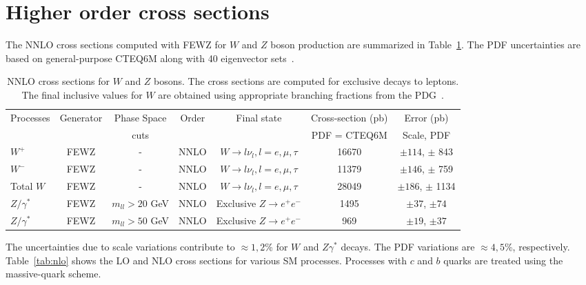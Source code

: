 \section{Higher order cross sections}
\label{sec:results}
The NNLO cross sections computed with FEWZ for $W$ and $Z$ boson production 
are summarized in 
Table~\ref{tab:nnlo}. The PDF uncertainties are based on general-purpose 
CTEQ6M along with 40 eigenvector sets~\cite{cteq6m}.

\vspace{3mm}
\begin{table}[hbt]
\begin{center}
\renewcommand{\arraystretch}{1.2}
\begin{tabular}{|l|c|c|c|c|c|c|}\hline
Processes & Generator & Phase Space& Order & Final state & Cross-section (pb)& Error (pb) \\ 
 &  &  cuts & & & PDF = CTEQ6M & Scale, PDF \\ \hline
$W^+$ & FEWZ & - & NNLO & $W \rightarrow l \nu_l, l=e,\mu,\tau$ & 16670 & $\pm 114$, $\pm$ 843 \\ \hline
$W^-$ & FEWZ & - & NNLO & $W \rightarrow l \nu_l, l=e,\mu,\tau$ & 11379 & $\pm 146$, $\pm$ 759 \\ \hline
Total $W$ & FEWZ & - & NNLO & $W \rightarrow l \nu_l, l=e,\mu,\tau$ & 28049 & $\pm 186$, $\pm$ 1134 \\ \hline
$Z/\gamma^*$ & FEWZ & $m_{ll} > 20$ GeV & NNLO & Exclusive $Z \rightarrow e^+e^-$ & 1495 & $\pm 37$, $\pm 74$ \\ \hline
$Z/\gamma^*$ & FEWZ & $m_{ll} > 50$ GeV & NNLO & Exclusive $Z \rightarrow e^+e^-$ & 969 & $\pm 19$, $\pm 37$ \\ \hline
\end{tabular} 
\caption{NNLO cross sections for $W$ and $Z$ bosons. The cross sections are computed for
exclusive decays to leptons. The final inclusive values for $W$ are obtained using appropriate 
branching fractions from the PDG~\cite{pdg}. \label{tab:nnlo}}
\end{center}
\end{table}

The uncertainties due to scale variations contribute to $\approx 1, 2$\% for 
$W$ and $Z\gamma^*$ decays. The PDF variations are $\approx 4, 5$\%, 
respectively. Table~\ref{tab:nlo} shows the LO and NLO cross sections for 
various SM processes. Processes with $c$ and $b$ quarks are treated using the 
massive-quark scheme.

